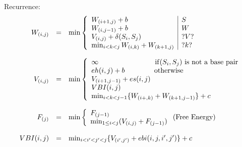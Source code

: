 \documentclass[11pt]{article}
\begin{document}
Recurrence:
\[\begin{array}{rcl}
W_{(i,j)}&=&\min\left\{\begin{array}{l|l}
	W_{(i+1,j)}+b & S\\
	W_{(i,j-1)}+b & W\\
	V_{(i,j)}+\delta(S_i,S_j) & ?V? \\
	\min_{i<k<j}W_{(i,k)}+W_{(k+1,j)} & ?k?
\end{array}\right.\\
\\
V_{(i,j)}&=&\min\left\{\begin{array}{ll}
	\infty \qquad\qquad\qquad\qquad {\rm if}(S_i,S_j) \text{ is not a base pair}\\
	eh(i,j)+b \qquad\qquad\, \text{otherwise} \\
	V_{(i+1,j-1)}+es(i,j) \\
	VBI(i,j) \\
	\min_{i<k<j-1}\{W_{(i+,k)}+W_{(k+1,j-1)}\} +c
\end{array}\right.\\
\\
 F_{(j)}&=&\min\left\{\begin{array}{ll} F_{(j-1)} \\ \min_{1\le i< j} (V_{(i,j)} + F_{(j-1)})
%
\end{array}\right. \text{(Free Energy)}\\\\
VBI(i,j)&=&\min_{i<i'<j'<j}\{V_{(i',j')}+ebi(i,j,i',j')\} +c
\end{array}\]
%







\end{document}
